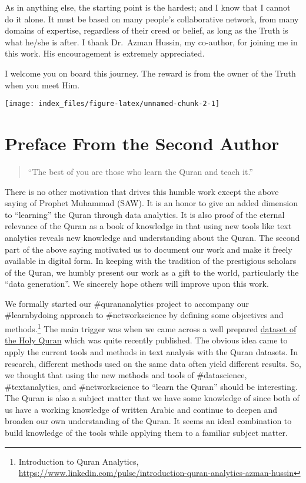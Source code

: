 \documentclass[
]{article}
\begin{document}
As in anything else, the starting point is the hardest; and I know that I cannot do it alone. It must be based on many people's collaborative network, from many domains of expertise, regardless of their creed or belief, as long as the Truth is what he/she is after. I thank Dr.~Azman Hussin, my co-author, for joining me in this work. His encouragement is extremely appreciated.

I welcome you on board this journey. The reward is from the owner of the Truth when you meet Him.

\begin{center}\texttt{[image: index\_files/figure-latex/unnamed-chunk-2-1]} \end{center}

\hypertarget{preface-from-the-second-author}{%
\section*{Preface From the Second Author}\label{preface-from-the-second-author}}

\begin{quote}
``The best of you are those who learn the Quran and teach it.''
\end{quote}

There is no other motivation that drives this humble work except the above saying of Prophet Muhammad (SAW). It is an honor to give an added dimension to ``learning'' the Quran through data analytics. It is also proof of the eternal relevance of the Quran as a book of knowledge in that using new tools like text analytics reveals new knowledge and understanding about the Quran. The second part of the above saying motivated us to document our work and make it freely available in digital form. In keeping with the tradition of the prestigious scholars of the Quran, we humbly present our work as a gift to the world, particularly the ``data generation''. We sincerely hope others will improve upon this work.

We formally started our \#qurananalytics project to accompany our \#learnbydoing approach to \#networkscience by defining some objectives and methods.\footnote{Introduction to Quran Analytics, \url{https://www.linkedin.com/pulse/introduction-quran-analytics-azman-hussin}} The main trigger was when we came across a well prepared \href{https://CRAN.R-project.org/package=quRan}{dataset of the Holy Quran} which was quite recently published. The obvious idea came to apply the current tools and methods in text analysis with the Quran datasets. In research, different methods used on the same data often yield different results. So, we thought that using the new methods and tools of \#datascience, \#textanalytics, and \#networkscience to ``learn the Quran'' should be interesting. The Quran is also a subject matter that we have some knowledge of since both of us have a working knowledge of written Arabic and continue to deepen and broaden our own understanding of the Quran. It seems an ideal combination to build knowledge of the tools while applying them to a familiar subject matter.
\end{document}
